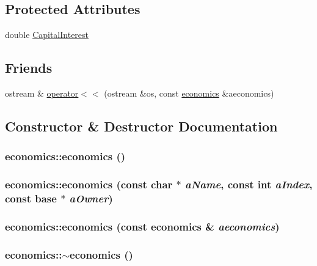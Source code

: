 \subsection*{Protected Attributes}
\begin{DoxyCompactItemize}
\item 
double \hyperlink{classeconomics_a98c8e8e0f654dbaa12660a2725e81e51}{CapitalInterest}
\end{DoxyCompactItemize}
\subsection*{Friends}
\begin{DoxyCompactItemize}
\item 
ostream \& \hyperlink{classeconomics_ac7fa5eba4fc9ff13bcf5d57d9c1183a2}{operator$<$$<$} (ostream \&os, const \hyperlink{classeconomics}{economics} \&aeconomics)
\end{DoxyCompactItemize}


\subsection{Constructor \& Destructor Documentation}
\hypertarget{classeconomics_a2699a35c078fdc7625e7b2ce05d0790c}{
\subsubsection[{economics}]{\setlength{\rightskip}{0pt plus 5cm}economics::economics ()}}
\label{classeconomics_a2699a35c078fdc7625e7b2ce05d0790c}
\hypertarget{classeconomics_a2c8b403989e127fa7e56cb5a54669d03}{
\subsubsection[{economics}]{\setlength{\rightskip}{0pt plus 5cm}economics::economics (const char $\ast$ {\em aName}, \/  const int {\em aIndex}, \/  const {\bf base} $\ast$ {\em aOwner})}}
\label{classeconomics_a2c8b403989e127fa7e56cb5a54669d03}
\hypertarget{classeconomics_ae3cba9af548529209efd2d02386b2535}{
\subsubsection[{economics}]{\setlength{\rightskip}{0pt plus 5cm}economics::economics (const {\bf economics} \& {\em aeconomics})}}
\label{classeconomics_ae3cba9af548529209efd2d02386b2535}
\hypertarget{classeconomics_a2b41b4743104166c60346e80b12c8c3e}{
\subsubsection[{$\sim$economics}]{\setlength{\rightskip}{0pt plus 5cm}economics::$\sim$economics ()}}
\label{classeconomics_a2b41b4743104166c60346e80b12c8c3e}


